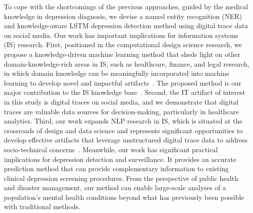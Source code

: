 To cope with the shortcomings of the previous approaches, guided by the medical knowledge in depression diagnosis, we devise a named entity recognition (NER) and knowledge-aware LSTM depression detection method using digital trace data on social media. Our work has important implications for information systems (IS) research. First, positioned in the computational design science research, we propose a knowledge-driven machine learning method that sheds light on other domain-knowledge-rich areas in IS, such as healthcare, finance, and legal research, in which domain knowledge can be meaningfully incorporated into machine learning to develop novel and impactful artifacts~\citep{abbasi_towards_2020}. The proposed method is our major contribution to the IS knowledge base~\citep{padmanabhan_machine_2022}. Second, the IT artifact of interest in this study is digital traces on social media, and we demonstrate that digital traces are valuable data sources for decision-making, particularly in healthcare analytics. Third, our work expands NLP research in IS, which is situated at the crossroads of design and data science and represents significant opportunities to develop effective artifacts that leverage unstructured digital trace data to address socio-technical concerns~\citep{yang_getting_2022,abbasi_big_2016}. Meanwhile, our work has significant practical implications for depression detection and surveillance. It provides an accurate prediction method that can provide complementary information to existing clinical depression screening procedures. From the perspective of public health and disaster management, our method can enable large-scale analyses of a population's mental health conditions beyond what has previously been possible with traditional methods.